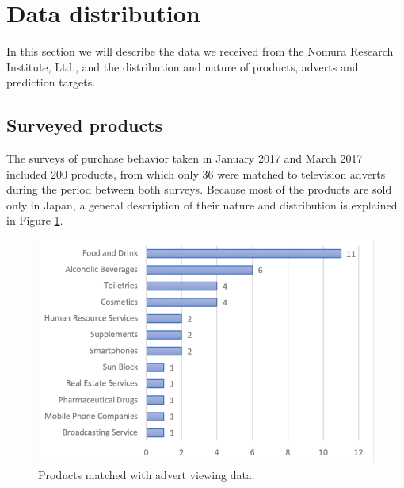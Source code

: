 \documentclass[review]{elsarticle}
\begin{document}
\section{Data distribution}
\label{data_dist}

In this section we will describe the data we received from the Nomura Research Institute, Ltd., and the distribution and nature of products, adverts and prediction targets.

\subsection{Surveyed products}
\label{product_data}

The surveys of purchase behavior taken in January 2017 and March 2017 included 200 products, from which only 36 were matched to television adverts during the period between both surveys. Because most of the products are sold only in Japan, a general description of their nature and distribution is explained in Figure \ref{fig:product_dist}. 


\begin{figure}[htp]
\centering
\includegraphics[width=35em]{figures/product_categories_36.png}
\caption{Products matched with advert viewing data.}
\label{fig:product_dist}
\end{figure} 

\end{document}
